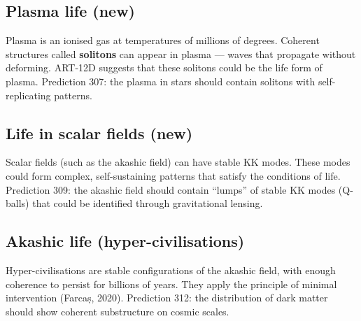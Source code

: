 \subsection{Plasma life (new)}
Plasma is an ionised gas at temperatures of millions of degrees. Coherent structures called \textbf{solitons} can appear in plasma --- waves that propagate without deforming. ART-12D suggests that these solitons could be the life form of plasma. Prediction 307: the plasma in stars should contain solitons with self-replicating patterns.

\subsection{Life in scalar fields (new)}
Scalar fields (such as the akashic field) can have stable KK modes. These modes could form complex, self-sustaining patterns that satisfy the conditions of life. Prediction 309: the akashic field should contain ``lumps'' of stable KK modes (Q-balls) that could be identified through gravitational lensing.

\subsection{Akashic life (hyper-civilisations)}
Hyper-civilisations are stable configurations of the akashic field, with enough coherence to persist for billions of years. They apply the principle of minimal intervention (Farcaș, 2020). Prediction 312: the distribution of dark matter should show coherent substructure on cosmic scales.

\newpage
